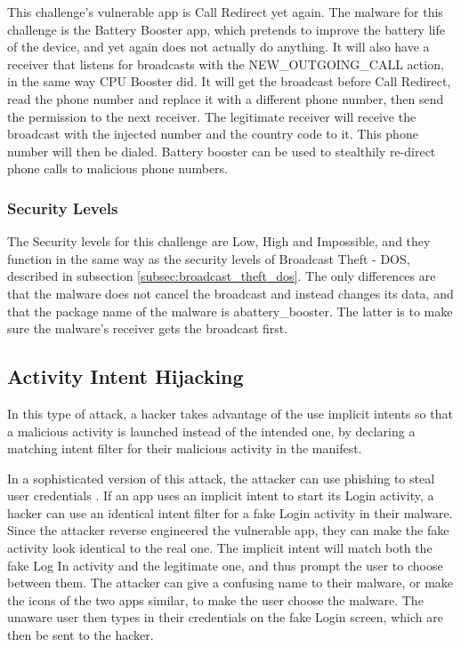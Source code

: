     This challenge's vulnerable app is Call Redirect yet again. The malware for this challenge is the Battery Booster app, which pretends to improve the battery life of the device, and yet again does not actually do anything. It will also have a receiver that listens for broadcasts with the NEW\_OUTGOING\_CALL action, in the same way CPU Booster did. It will get the broadcast before Call Redirect, read the phone number and replace it with a different phone number, then send the permission to the next receiver. The legitimate receiver will receive the broadcast with the injected number and the country code to it. This phone number will then be dialed. Battery booster can be used to stealthily re-direct phone calls to malicious phone numbers.
    
    \subsubsection{Security Levels}
        \label{subsubsec:broadcast_theft_mitm_security_levels}
        
    The Security levels for this challenge are Low, High and Impossible, and they function in the same way as the security levels of Broadcast Theft - DOS, described in subsection \ref{subsec:broadcast_theft_dos}. The only differences are that the malware does not cancel the broadcast and instead changes its data, and that the package name of the malware is abattery\_booster. The latter is to make sure the malware's receiver gets the broadcast first.
    
    \subsection{Activity Intent Hijacking}
        \label{subsec:activity_hijacking}
        
    In this type of attack, a hacker takes advantage of the use implicit intents so that a malicious activity is launched instead of the intended one, by declaring a matching intent filter for their malicious activity in the manifest.
    
    In a sophisticated version of this attack, the attacker can use phishing to steal user credentials \cite{2010_icc_paper}. If an app uses an implicit intent to start its Login activity, a hacker can use an identical intent filter for a fake Login activity in their malware. Since the attacker reverse engineered the vulnerable app, they can make the fake activity look identical to the real one. The implicit intent will match both the fake Log In activity and the legitimate one, and thus prompt the user to choose between them. The attacker can give a confusing name to their malware, or make the icons of the two apps similar, to make the user choose the malware. The unaware user then types in their credentials on the fake Login screen, which are then be sent to the hacker.
    
